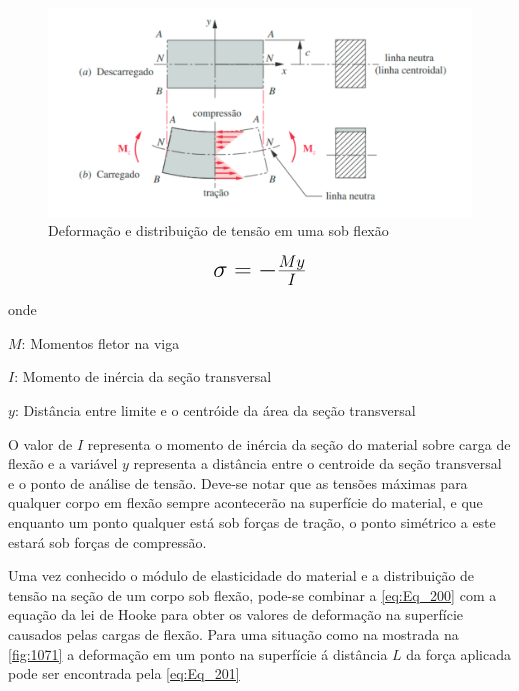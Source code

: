 \begin{figure}[htb]
	\caption{\label{fig:1070} Deformação e distribuição de tensão em uma sob flexão}
	\begin{center}
		\includegraphics[width=\textwidth]{pictures/1070.png}
	\end{center}
\end{figure}

\begin{equation}\label{eq:Eq_200}%
\mbox{\fontsize{17.28}{21.6}\selectfont\( %
\sigma = - \frac{My}{I}
\)} %
\end{equation}

onde

$M$: Momentos fletor na viga

$I$: Momento de inércia da seção transversal

$y$: Distância entre limite e o centróide da área da seção transversal

\hfill

O valor de $I$ representa o momento de inércia da seção do material sobre carga de flexão e a variável $y$ representa a distância entre o centroide da seção transversal
e o ponto de análise de tensão.
Deve-se notar que as tensões máximas para qualquer corpo em flexão sempre acontecerão na superfície do material, e que enquanto um ponto qualquer está sob forças de tração,
o ponto simétrico a este estará sob forças de compressão.

Uma vez conhecido o módulo de elasticidade do material e a distribuição de tensão na seção de um corpo sob flexão,
pode-se combinar a \autoref{eq:Eq_200} com a equação da lei de Hooke para obter os valores de deformação na superfície
causados pelas cargas de flexão.
Para uma situação como na mostrada na \autoref{fig:1071} a deformação em um ponto na superfície á distância $ L $ da força aplicada pode ser encontrada pela \autoref{eq:Eq_201}

